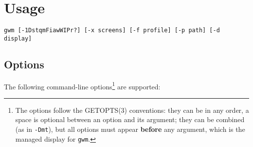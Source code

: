 \chapter{Usage}
{\tt gwm [-1DstqmFiawWIPr?] [-x screens]  [-f profile] [-p path] [-d display]}

\section{Options}

The following command-line options\footnote{The options follow the
GETOPTS(3) conventions: they can be in any order, a space is optional between
an option and its argument; they can be combined (as in {\tt -Dmt}), but all
options must appear {\bf before} any argument, which is the managed display
for {\tt gwm}.} are supported:

